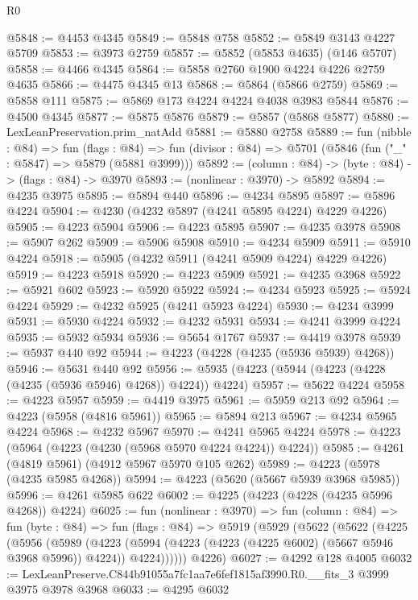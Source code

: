 \begin{lexlean}{R0}
\begin{coremodule}
@5848 := @4453 @4345
@5849 := @5848 @758
@5852 := @5849 @3143 @4227 @5709
@5853 := @3973 @2759
@5857 := @5852 (@5853 @4635) (@146 @5707)
@5858 := @4466 @4345
@5864 := @5858 @2760 @1900 @4224 @4226 @2759 @4635
@5866 := @4475 @4345 @13
@5868 := @5864 (@5866 @2759)
@5869 := @5858 @111
@5875 := @5869 @173 @4224 @4224 @4038 @3983 @5844
@5876 := @4500 @4345
@5877 := @5875 @5876
@5879 := @5857 (@5868 @5877)
@5880 := LexLeanPreservation.prim_natAdd
@5881 := @5880 @2758
@5889 := fun (nibble : @84) =>
  fun (flags : @84) =>
  fun (divisor : @84) => @5701 (@5846 (fun ("_" : @5847) => @5879 (@5881 @3999)))
@5892 := (column : @84) -> (byte : @84) -> (flags : @84) -> @3970
@5893 := (nonlinear : @3970) -> @5892
@5894 := @4235 @3975
@5895 := @5894 @440
@5896 := @4234 @5895
@5897 := @5896 @4224
@5904 := @4230 (@4232 @5897 (@4241 @5895 @4224) @4229 @4226)
@5905 := @4223 @5904
@5906 := @4223 @5895
@5907 := @4235 @3978
@5908 := @5907 @262
@5909 := @5906 @5908
@5910 := @4234 @5909
@5911 := @5910 @4224
@5918 := @5905 (@4232 @5911 (@4241 @5909 @4224) @4229 @4226)
@5919 := @4223 @5918
@5920 := @4223 @5909
@5921 := @4235 @3968
@5922 := @5921 @602
@5923 := @5920 @5922
@5924 := @4234 @5923
@5925 := @5924 @4224
@5929 := @4232 @5925 (@4241 @5923 @4224)
@5930 := @4234 @3999
@5931 := @5930 @4224
@5932 := @4232 @5931
@5934 := @4241 @3999 @4224
@5935 := @5932 @5934
@5936 := @5654 @1767
@5937 := @4419 @3978
@5939 := @5937 @440 @92
@5944 := @4223 (@4228 (@4235 (@5936 @5939) @4268))
@5946 := @5631 @440 @92
@5956 := @5935 (@4223 (@5944 (@4223 (@4228 (@4235 (@5936 @5946) @4268)) @4224)) @4224)
@5957 := @5622 @4224
@5958 := @4223 @5957
@5959 := @4419 @3975
@5961 := @5959 @213 @92
@5964 := @4223 (@5958 (@4816 @5961))
@5965 := @5894 @213
@5967 := @4234 @5965 @4224
@5968 := @4232 @5967
@5970 := @4241 @5965 @4224
@5978 := @4223 (@5964 (@4223 (@4230 (@5968 @5970 @4224 @4224)) @4224))
@5985 := @4261 (@4819 @5961) (@4912 @5967 @5970 @105 @262)
@5989 := @4223 (@5978 (@4235 @5985 @4268))
@5994 := @4223 (@5620 (@5667 @5939 @3968 @5985))
@5996 := @4261 @5985 @622
@6002 := @4225 (@4223 (@4228 (@4235 @5996 @4268)) @4224)
@6025 := fun (nonlinear : @3970) =>
  fun (column : @84) =>
  fun (byte : @84) =>
  fun (flags : @84) =>
  @5919
    (@5929
      (@5622
        (@5622
          (@4225
            (@5956
              (@5989
                (@4223
                  (@5994 (@4223 (@4223 (@4225 @6002) (@5667 @5946 @3968 @5996)) @4224))
                  @4224))))))
      @4226)
@6027 := @4292 @128 @4005
@6032 := LexLeanPreserve.C844b91055a7fc1aa7e6fef1815af3990.R0.__fits_3 @3999 @3975 @3978 @3968
@6033 := @4295 @6032

\end{coremodule}
\end{lexlean}
